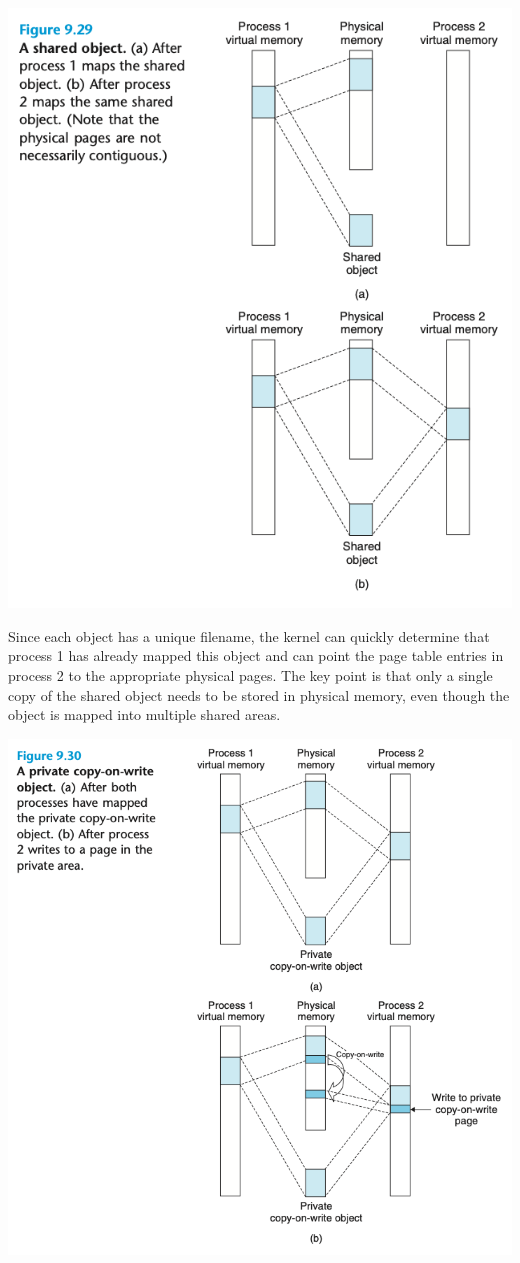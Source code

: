 \documentclass[11pt]{article}
\begin{document}
\begin{center}
\includegraphics[width=.9\linewidth]{pics/figure9.29-shared-object.png}
\end{center}
Since each object has a unique filename, the kernel can quickly determine that process 1 has already mapped this object and can point the page table entries in process 2 to the appropriate physical pages. The key point is that only a single copy of the shared object needs to be stored in physical memory, even though the object is mapped into multiple shared areas.\\


\begin{center}
\includegraphics[width=.9\linewidth]{pics/figure9.30-copy-on-write.png}
\end{center}
\end{document}
